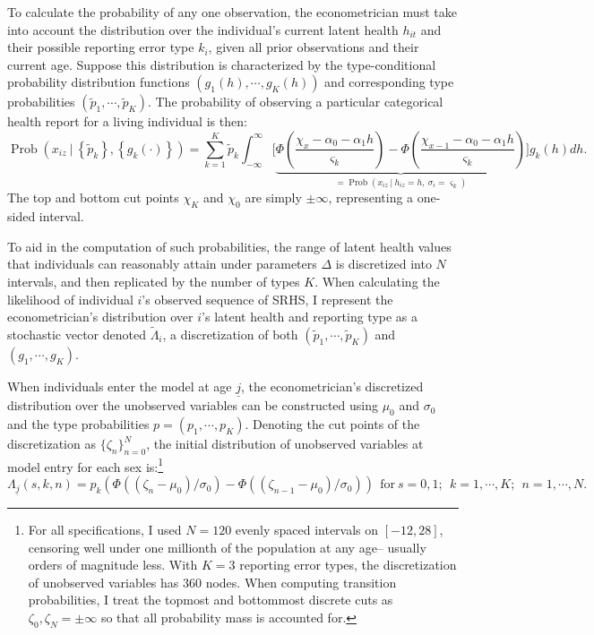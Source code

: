 \documentclass[12pt,pdftex,letterpaper]{article}
\newcommand{\Prob}{\operatorname{Prob}}
\newcommand{\Health}{h}
\newcommand{\Report}{x}
\newcommand{\Age}{j}
\newcommand{\Sex}{s}
\newcommand{\AgeMin}{\underline{\Age}}
\newcommand{\HealthInitMean}{\mu_0}
\newcommand{\HealthInitStd}{\sigma_0}
\newcommand{\Cut}{\chi}
\newcommand{\DiscreteCut}{\zeta}
\newcommand{\LatentParam}{\alpha}
\newcommand{\TypeProb}{p}
\newcommand{\TypeProbPcvd}{\widetilde{\TypeProb}}
\newcommand{\ReportStd}{\varsigma}
\newcommand{\HealthDstn}{\Lambda}
\newcommand{\HealthDstnPcvd}{\widetilde{\Lambda}}
\begin{document}
To calculate the probability of any one observation, the econometrician must take into account the distribution over the individual's current latent health $\Health_{it}$ and their possible reporting error type $k_i$, given all prior observations and their current age. Suppose this distribution is characterized by the type-conditional probability distribution functions $(g_1(\Health), \cdots, g_K(\Health))$ and corresponding type probabilities $(\TypeProbPcvd_1,\cdots, \TypeProbPcvd_K)$. The probability of observing a particular categorical health report for a living individual is then:
\begin{equation}\label{ReportProb}
\Prob \left( \Report_{iz} ~\big|~ \left\{\TypeProbPcvd_k \right\}, \left\{g_k(\cdot) \right\} \right) = \sum_{k=1}^K \TypeProbPcvd_k \int_{-\infty}^{\infty} \bigg[ \underbrace{\Phi \left(\frac{\Cut_{\Report} - \LatentParam_0 - \LatentParam_1 \Health}{\ReportStd_k} \right) - \Phi \left(\frac{\Cut_{\Report-1} - \LatentParam_0 - \LatentParam_1 \Health}{\ReportStd_k} \right)}_{= \Prob(\Report_{iz} ~|~ \Health_{iz} = \Health, ~ \sigma_i=\ReportStd_k)} \bigg]  g_k(\Health) d \Health.
\end{equation}
The top and bottom cut points $\Cut_K$ and $\Cut_0$ are simply $\pm \infty$, representing a one-sided interval.

To aid in the computation of such probabilities, the range of latent health values that individuals can reasonably attain under parameters $\Delta$ is discretized into $N$ intervals, and then replicated by the number of types $K$.  When calculating the likelihood of individual $i$'s observed sequence of SRHS, I represent the econometrician's distribution over $i$'s latent health and reporting type as a stochastic vector denoted $\HealthDstnPcvd_i$, a discretization of both $(\TypeProbPcvd_1,\cdots,\TypeProbPcvd_K)$ and $(g_1,\cdots,g_K)$.

When individuals enter the model at age $\AgeMin$, the econometrician's discretized distribution over the unobserved variables can be constructed using $\HealthInitMean$ and $\HealthInitStd$ and the type probabilities $\TypeProb = (\TypeProb_1,\cdots,\TypeProb_K)$. Denoting the cut points of the discretization as $\{\DiscreteCut_n\}_{n=0}^N$, the initial distribution of unobserved variables at model entry for each sex is:\footnote{For all specifications, I used $N=120$ evenly spaced intervals on $[-12,28]$, censoring well under one millionth of the population at any age-- usually orders of magnitude less. With $K=3$ reporting error types, the discretization of unobserved variables has 360 nodes. When computing transition probabilities, I treat the topmost and bottommost discrete cuts as $\DiscreteCut_0,\DiscreteCut_N=\pm \infty$ so that all probability mass is accounted for.}
\begin{equation}
\HealthDstn_{\AgeMin}(\Sex,k,n) = \TypeProb_k \left(\Phi((\DiscreteCut_n - \HealthInitMean)/\HealthInitStd) - \Phi((\DiscreteCut_{n-1} - \HealthInitMean)/\HealthInitStd) \right) ~~\text{for}~ s=0,1; ~~ k=1,\cdots,K; ~~ n=1,\cdots,N.
\end{equation}
\end{document}
